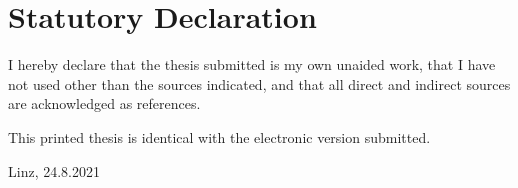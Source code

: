 \def\place{Linz}
\def\date{24.8.2021}

\section*{Statutory Declaration}
I hereby declare that the thesis submitted is my own unaided work, that I have not used other than the sources indicated, and that all direct and indirect sources are acknowledged as references.

\bigskip\noindent
This printed thesis is identical with the electronic version submitted.

\vskip3cm
\noindent
\place, \date
